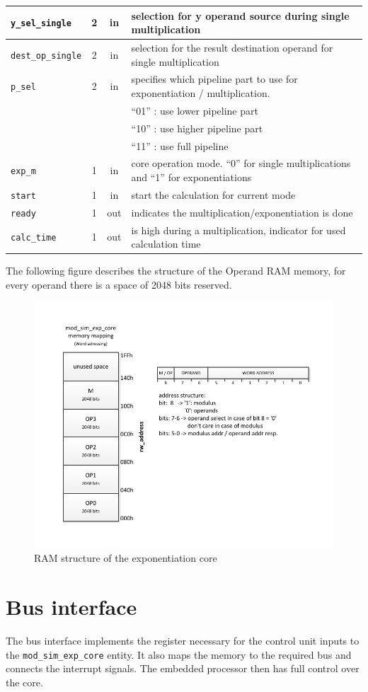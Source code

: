\begin{tabular}{|l|c|c|p{8cm}|}
\hline
\verb|y_sel_single| & 2     & in    & selection for y operand source during single multiplication \bigstrut\\
\hline
\verb|dest_op_single| & 2     & in    & selection for the result destination operand for single multiplication \bigstrut\\
\hline
\verb|p_sel| & 2     & in    & specifies which pipeline part to use for exponentiation / multiplication. \bigstrut[t]\\
      &       &       & ``01'' : use lower pipeline part \\
      &       &       & ``10'' : use higher pipeline part \\
      &       &       & ``11'' : use full pipeline \bigstrut[b]\\
\hline
\verb|exp_m| & 1     & in    & core operation mode. ``0'' for single multiplications and ``1'' for exponentiations \bigstrut\\
\hline
\verb|start| & 1     & in    & start the calculation for current mode \bigstrut\\
\hline
\verb|ready| & 1     & out   & indicates the multiplication/exponentiation is done \bigstrut\\
\hline
\verb|calc_time| & 1     & out   & is high during a multiplication, indicator for used calculation time \bigstrut\\
\hline
\end{tabular}%
\newpage
The following figure describes the structure of the Operand RAM memory, for every operand there is a space of 2048 bits 
reserved.\\
\begin{figure}[H]
\centering
\includegraphics[trim=1.2cm 1.2cm 1.2cm 1.2cm, width=15cm]{pictures/msec_memory.pdf}
\caption{RAM structure of the exponentiation core}
\label{RAM_structure}
\end{figure}

\section{Bus interface}
The bus interface implements the register necessary for the control unit inputs to the \verb|mod_sim_exp_core| entity.
It also maps the memory to the required bus and connects the interrupt signals. The embedded processor then has full control
over the core.